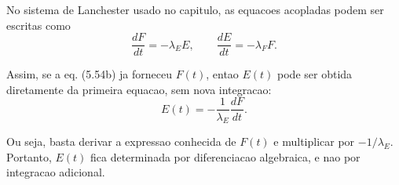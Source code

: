 No sistema de Lanchester usado no capitulo, as equacoes acopladas podem ser escritas como
\[
\frac{dF}{dt}=-\lambda_EE,
\qquad
\frac{dE}{dt}=-\lambda_FF.
\]

Assim, se a eq. (5.54b) ja forneceu $F(t)$, entao $E(t)$ pode ser obtida diretamente da primeira equacao, sem nova integracao:
\[
E(t)=-\frac{1}{\lambda_E}\frac{dF}{dt}.
\]

Ou seja, basta derivar a expressao conhecida de $F(t)$ e multiplicar por $-1/\lambda_E$. Portanto, $E(t)$ fica determinada por diferenciacao algebraica, e nao por integracao adicional.